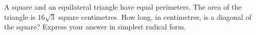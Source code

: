 A square and an equilateral triangle have equal perimeters. The area of the triangle is $16\sqrt3$ square centimetres. How long, in centimetres, is a diagonal of the square? Express your answer in simplest radical form.
